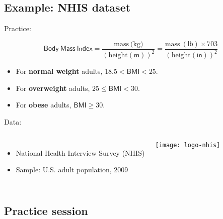 \documentclass[t]{beamer}
\begin{document}
	\subsection{Example: NHIS dataset}
	
	\begin{frame}[t]{Practice: }

		$$\mathsf{Body~Mass~Index} = \frac{\mbox{mass} \ \mbox{(kg)}}{\left( \mbox{height}(\mathsf{m})\right)^2} = \frac{\mbox{mass} \ \mathsf{(lb)} \times 703}{\left(\mbox{height} (\mathsf{in})\right)^2}$$
		
		\vspace{1em}

		\begin{itemize}
			\item For \textbf{normal weight} adults, $18.5 < \mathsf{BMI} < 25$.
			\item For \textbf{overweight} adults, $25 \leq \mathsf{BMI} < 30$.
			\item For \textbf{obese }adults, $\mathsf{BMI} \geq 30$.		
		\end{itemize}

		\vspace{1em}
		
    Data:
	
			\begin{columns}[c]
				
				\begin{itemize}
					\item National Health Interview Survey (NHIS)
					\item Sample: U.S. adult population, 2009
				\end{itemize}
	
				\texttt{[image: logo-nhis]}
			\end{columns}
	
	\end{frame}
	
	\subsection{Practice session}
  
\end{document}
